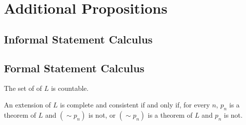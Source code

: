 \appendix

\chapter{Additional Propositions}

\section*{Informal Statement Calculus}

\section*{Formal Statement Calculus}

\begin{proposition}
  The set of \wfs{} of \(L\) is countable.
\end{proposition}

\begin{proposition}
  An extension of \(L\) is complete and consistent if and only if, for every \(n\), \(p_n\) is a theorem of \(L\) and \((\sim p_n)\) is not, or \((\sim p_n)\) is a theorem of \(L\) and \(p_n\) is not.

  \prf{}
\end{proposition}
